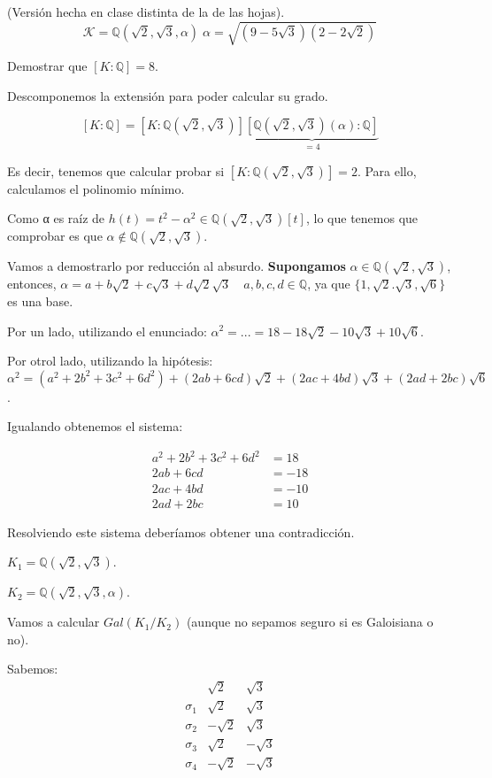 \begin{problem}[5] (Versión hecha en clase distinta de la de las hojas).
$$\mathcal{K} = ℚ(\sqrt{2},\sqrt{3},α)\; α = \sqrt{(9-5\sqrt{3})(2-2\sqrt{2})}$$

Demostrar que $[K:ℚ] = 8$.
\solution

Descomponemos la extensión para poder calcular su grado.

$$[K:ℚ] = [K: ℚ(\sqrt{2},\sqrt{3})]\underbrace{[ℚ(\sqrt{2},\sqrt{3})(α):ℚ]}_{=4}$$

Es decir, tenemos que calcular probar si $[K: ℚ(\sqrt{2},\sqrt{3})]= 2$. Para ello, calculamos el polinomio mínimo.

Como α es raíz de $h(t) = t^2-α^2 ∈ℚ(\sqrt{2},\sqrt{3})[t]$, lo que tenemos que comprobar es que $α∉ℚ(\sqrt{2},\sqrt{3})$.

Vamos a demostrarlo por reducción al absurdo. \textbf{Supongamos} $α∈ℚ(\sqrt{2},\sqrt{3})$, entonces, $α = a+b\sqrt{2} + c \sqrt{3} + d\sqrt{2}\sqrt{3}\quad a,b,c,d∈ℚ$, ya que $\{1,\sqrt{2}.\sqrt{3},\sqrt{6}\}$ es una base.

Por un lado, utilizando el enunciado: $α^2 =  ... = 18-18\sqrt{2} - 10\sqrt{3} + 10\sqrt{6}$.

Por otrol lado, utilizando la hipótesis:
$α^2 =(a^2+2b^2 + 3c^2 + 6d^2) + (2ab + 6cd) \sqrt{2} + (2ac + 4bd)\sqrt{3}+(2ad + 2bc) \sqrt{6}$.

Igualando obtenemos el sistema:

\[
\begin{array}{cc}
a^2+2b^2 + 3c^2 + 6d^2 &= 18\\2ab + 6cd &= -18 \\ 2ac + 4bd &= -10\\ 2ad + 2bc &= 10
\end{array}
\]

Resolviendo este sistema deberíamos obtener una contradicción.


\ppart

$K_1 = ℚ(\sqrt{2},\sqrt{3})$.

$K_2 = ℚ(\sqrt{2},\sqrt{3},α)$.


Vamos a calcular $Gal(K_1/K_2)$ (aunque no sepamos seguro si es Galoisiana o no).

Sabemos: $$\begin{array}{c|c|c}
&\sqrt{2}&\sqrt{3}\\\hline
σ_1 & \sqrt{2} & \sqrt{3}\\
σ_2 & - \sqrt{2} & \sqrt{3}\\
σ_3 & \sqrt{2} & -\sqrt{3}\\
σ_4 & - \sqrt{2} & -\sqrt{3}\end{array}
$$


\end{problem}
